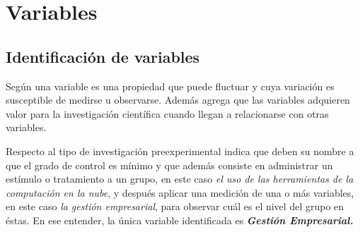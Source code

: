 \section{Variables}

\subsection{Identificación de variables}
Según \cite{sampieri} una variable es una propiedad que puede fluctuar y cuya
variación es susceptible de medirse u observarse. Además agrega que las variables
adquieren valor para la investigación científica cuando llegan a relacionarse
con otras variables.

Respecto al tipo de investigación preexperimental \cite{sampieri} indica que deben
su nombre a que el grado de control es mínimo y que además consiste en administrar
un estímulo o tratamiento a un grupo, en este caso \emph{el uso de las herramientas
de la computación en la nube}, y después aplicar una medición de una o más
variables, en este caso \emph{la gestión empresarial}, para observar cuál es
el nivel del grupo  en éstas. En ese entender, la única variable identificada es
\emph{\textbf{Gestión Empresarial.}}
